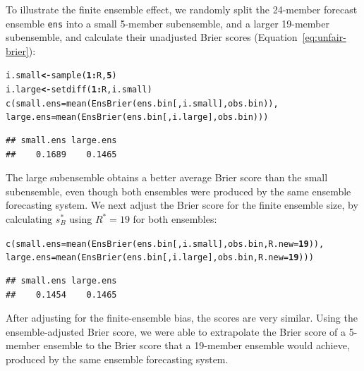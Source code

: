 \documentclass[10pt]{article}\usepackage[]{graphicx}\usepackage[]{color}
\makeatletter
\newcommand{\hlnum}[1]{\textcolor[rgb]{0.502,0,0.502}{\textbf{#1}}}%
\newcommand{\hlopt}[1]{\textcolor[rgb]{1,0,0.502}{\textbf{#1}}}%
\newcommand{\hlstd}[1]{\textcolor[rgb]{0,0,0}{#1}}%
\newcommand{\hlkwb}[1]{\textcolor[rgb]{0.502,0.502,0.753}{\textbf{#1}}}%
\newcommand{\hlkwc}[1]{\textcolor[rgb]{0,0.502,0.753}{#1}}%
\newcommand{\hlkwd}[1]{\textcolor[rgb]{0,0.267,0.4}{#1}}%
\newenvironment{kframe}{%
 \def\at@end@of@kframe{}%
 \ifinner\ifhmode%
  \def\at@end@of@kframe{\end{minipage}}%
  \begin{minipage}{\columnwidth}%
 \fi\fi%
 \def\FrameCommand##1{\hskip\@totalleftmargin \hskip-\fboxsep
 \colorbox{shadecolor}{##1}\hskip-\fboxsep
     \hskip-\linewidth \hskip-\@totalleftmargin \hskip\columnwidth}%
 \MakeFramed {\advance\hsize-\width
   \@totalleftmargin\z@ \linewidth\hsize
   \@setminipage}}%
 {\par\unskip\endMakeFramed%
 \at@end@of@kframe}
\newenvironment{knitrout}{}{} %
\newcommand{\code}[1]{\texttt{#1}}
\makeatother
\begin{document}
To illustrate the finite ensemble effect, we randomly split the 24-member forecast ensemble \code{ens} into a small 5-member subensemble, and a larger 19-member subensemble, and calculate their unadjusted Brier scores (Equation~\ref{eq:unfair-brier}):
%
\begin{knitrout}
\color{fgcolor}\begin{kframe}
\begin{alltt}
\hlstd{i.small} \hlkwb{<-} \hlkwd{sample}\hlstd{(}\hlnum{1}\hlopt{:}\hlstd{R,} \hlnum{5}\hlstd{)}
\hlstd{i.large} \hlkwb{<-} \hlkwd{setdiff}\hlstd{(}\hlnum{1}\hlopt{:}\hlstd{R, i.small)}
\hlkwd{c}\hlstd{(}\hlkwc{small.ens}\hlstd{=}\hlkwd{mean}\hlstd{(}\hlkwd{EnsBrier}\hlstd{(ens.bin[, i.small], obs.bin)),}
  \hlkwc{large.ens}\hlstd{=}\hlkwd{mean}\hlstd{(}\hlkwd{EnsBrier}\hlstd{(ens.bin[, i.large], obs.bin)))}
\end{alltt}
\begin{verbatim}
## small.ens large.ens 
##    0.1689    0.1465
\end{verbatim}
\end{kframe}
\end{knitrout}
%
The large subensemble obtains a better average Brier score than the small subensemble, even though both ensembles were produced by the same ensemble forecasting system.
We next adjust the Brier score for the finite ensemble size, by calculating $s_{B}^*$ using $R^*=19$ for both ensembles:
%
\begin{knitrout}
\color{fgcolor}\begin{kframe}
\begin{alltt}
\hlkwd{c}\hlstd{(}\hlkwc{small.ens}\hlstd{=}\hlkwd{mean}\hlstd{(}\hlkwd{EnsBrier}\hlstd{(ens.bin[, i.small], obs.bin,} \hlkwc{R.new}\hlstd{=}\hlnum{19}\hlstd{)),}
  \hlkwc{large.ens}\hlstd{=}\hlkwd{mean}\hlstd{(}\hlkwd{EnsBrier}\hlstd{(ens.bin[, i.large], obs.bin,} \hlkwc{R.new}\hlstd{=}\hlnum{19}\hlstd{)))}
\end{alltt}
\begin{verbatim}
## small.ens large.ens 
##    0.1454    0.1465
\end{verbatim}
\end{kframe}
\end{knitrout}
%
After adjusting for the finite-ensemble bias, the scores are very similar. 
Using the ensemble-adjusted Brier score, we were able to extrapolate the Brier score of a 5-member ensemble to the Brier score that a 19-member ensemble would achieve, produced by the same ensemble forecasting system. 
\end{document}
